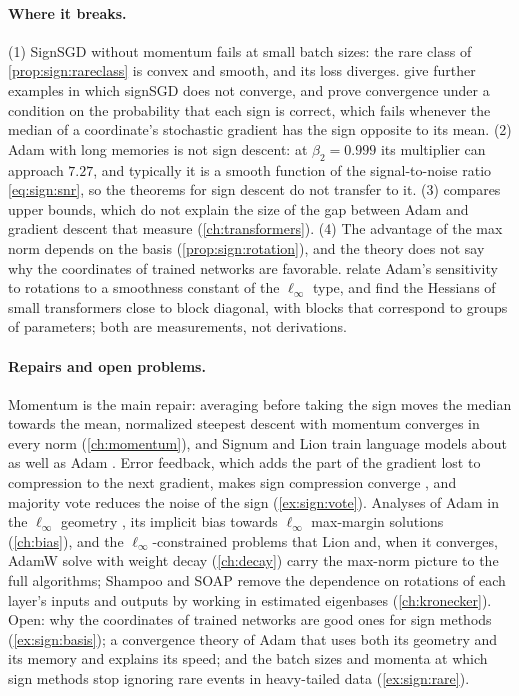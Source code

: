 \begin{refsection}
\paragraph{Where it breaks.} (1) SignSGD without momentum fails at small batch sizes: the rare class of \cref{prop:sign:rareclass} is convex and smooth, and its loss diverges. \Textcite{KarimireddyEtAl2019} give further examples in which signSGD does not converge, and \textcite{SafaryanRichtarik2021} prove convergence under a condition on the probability that each sign is correct, which fails whenever the median of a coordinate's stochastic gradient has the sign opposite to its mean. (2) Adam with long memories is not sign descent: at $\beta_2=0.999$ its multiplier can approach $7.27$, and typically it is a smooth function of the signal-to-noise ratio \eqref{eq:sign:snr}, so the theorems for sign descent do not transfer to it. (3)  compares upper bounds, which do not explain the size of the gap between Adam and gradient descent that \textcite{KunstnerEtAl2023} measure (\cref{ch:transformers}). (4) The advantage of the max norm depends on the basis (\cref{prop:sign:rotation}), and the theory does not say why the coordinates of trained networks are favorable. \Textcite{XieMohamadiLi2025} relate Adam's sensitivity to rotations to a smoothness constant of the $\ell_\infty$ type, and \textcite{ZhangEtAl2024} find the Hessians of small transformers close to block diagonal, with blocks that correspond to groups of parameters; both are measurements, not derivations.

\paragraph{Repairs and open problems.} Momentum is the main repair: averaging before taking the sign moves the median towards the mean, normalized steepest descent with momentum converges in every norm (\cref{ch:momentum}), and Signum and Lion train language models about as well as Adam \parencite{ZhaoEtAl2025}. Error feedback, which adds the part of the gradient lost to compression to the next gradient, makes sign compression converge \parencite{KarimireddyEtAl2019}, and majority vote reduces the noise of the sign (\cref{ex:sign:vote}). Analyses of Adam in the $\ell_\infty$ geometry \parencite{XieMohamadiLi2025}, its implicit bias towards $\ell_\infty$ max-margin solutions \parencite{ZhangZouCao2024} (\cref{ch:bias}), and the $\ell_\infty$-constrained problems that Lion and, when it converges, AdamW solve with weight decay \parencite{ChenLiuLiangLiu2024,XieLi2024} (\cref{ch:decay}) carry the max-norm picture to the full algorithms; Shampoo and SOAP remove the dependence on rotations of each layer's inputs and outputs by working in estimated eigenbases (\cref{ch:kronecker}). Open: why the coordinates of trained networks are good ones for sign methods (\cref{ex:sign:basis}); a convergence theory of Adam that uses both its geometry and its memory and explains its speed; and the batch sizes and momenta at which sign methods stop ignoring rare events in heavy-tailed data (\cref{ex:sign:rare}).


\end{refsection}

